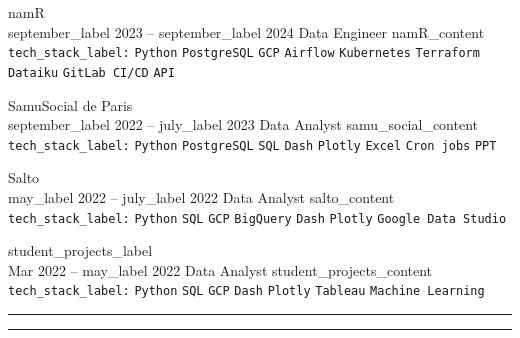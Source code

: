 \documentclass[9pt]{developercv} %
\begin{document}
    \begin{entrylist}
        \entry
        {namR                         \\\footnotesize{{{september_label}} 2023 -- {{september_label}} 2024}}
        {Data Engineer}
        {}
        {{{namR_content}}\\
        \texttt{{{tech_stack_label}}:}
        \texttt{Python}\slashsep
        \texttt{PostgreSQL}\slashsep
        \texttt{GCP}\slashsep
        \texttt{Airflow}\slashsep
        \texttt{Kubernetes}\slashsep
        \texttt{Terraform}\slashsep
        \texttt{Dataiku}\slashsep
        \texttt{GitLab CI/CD}\slashsep
        \texttt{API}                  \\
        }

        \entry
        {SamuSocial de Paris          \\\footnotesize{{{september_label}} 2022 -- {{july_label}} 2023}}
        {Data Analyst}
        {}
        {{{samu_social_content}}\\
        \texttt{{{tech_stack_label}}:}
        \texttt{Python}\slashsep
        \texttt{PostgreSQL}\slashsep
        \texttt{SQL}\slashsep
        \texttt{Dash}\slashsep
        \texttt{Plotly}\slashsep
        \texttt{Excel}\slashsep
        \texttt{Cron jobs}\slashsep
        \texttt{PPT}                  \\
        }

        \entry
        {Salto                        \\\footnotesize{{{may_label}} 2022 -- {{july_label}} 2022}}
        {Data Analyst}
        {}
        {{{salto_content}}\\
        \texttt{{{tech_stack_label}}:}
        \texttt{Python}\slashsep
        \texttt{SQL}\slashsep
        \texttt{GCP}\slashsep
        \texttt{BigQuery}\slashsep
        \texttt{Dash}\slashsep
        \texttt{Plotly}\slashsep
        \texttt{Google Data Studio}   \\
        }

        \entry
        {{{student_projects_label}}                                                                           \\\footnotesize{Mar 2022 -- {{may_label}} 2022}}
        {Data Analyst}
        {}
        {{{student_projects_content}}\\
        \texttt{{{tech_stack_label}}:}
        \texttt{Python}\slashsep
        \texttt{SQL}\slashsep
        \texttt{GCP}\slashsep
        \texttt{Dash}\slashsep
        \texttt{Plotly}\slashsep
        \texttt{Tableau}\slashsep
        \texttt{Machine Learning}
        }
    \end{entrylist}
    \noindent
    \textcolor{line-color}{\rule{0.25\textwidth}{0.5pt}} %
    \hfill
    \textcolor{line-color}{\rule{0.725\textwidth}{0.5pt}} %
\end{document}
